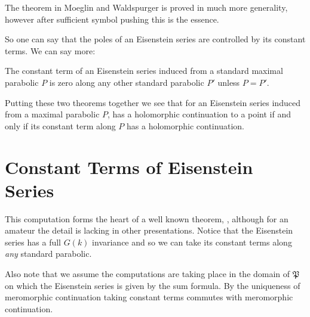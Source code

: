     \begin{remark}
    	The theorem in Moeglin and Waldspurger is proved in much more generality, however after sufficient symbol pushing this is the essence. 
    \end{remark}
    So one can say that the poles of an Eisenstein series are controlled by its constant terms. We can say more:
    
        
        \begin{theorem}
        	The constant term of an Eisenstein series induced from a standard maximal parabolic \(P\) is zero along any other standard parabolic \(P'\) unless \(P = P'\).
        \end{theorem}
        
        Putting these two theorems together we see that for an Eisenstein series induced from a maximal parabolic \(P\), has a holomorphic continuation to a point if and only if its constant term along \(P\) has a holomorphic continuation. 
      
      

\section{Constant Terms of Eisenstein Series}\label{const_eisenstein}
This computation forms the heart of a well known theorem, \cite[Prop 10.4.2]{getzIntroductionAutomorphicRepresentations2024}\cite[II.1.7]{moeglinSpectralDecompositionEisenstein1995}\cite[6.2]{shahidiEisensteinSeriesAutomorphic2010}, although for an amateur the detail is lacking in other presentations. Notice that the Eisenstein series has a full \(G(k)\) invariance and so we can take its constant terms along \textit{any} standard parabolic.

Also note that we assume the computations are taking place in the domain of \(\mathfrak{P}\) on which the Eisenstein series is given by the sum formula. By the uniqueness of meromorphic continuation taking constant terms commutes with meromorphic continuation.

